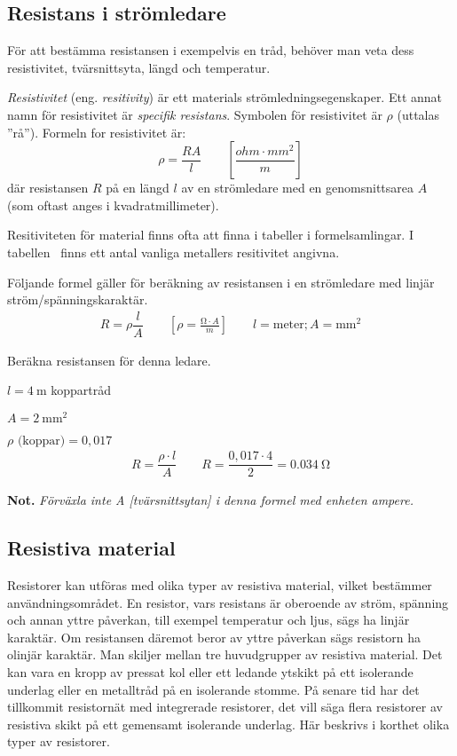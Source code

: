 \subsection{Resistans i strömledare}

För att bestämma resistansen i exempelvis en tråd, behöver man veta dess 
resistivitet, tvärsnittsyta, längd och temperatur.

\emph{Resistivitet} (eng. \emph{resitivity}) är ett materials
strömledningsegenskaper.
Ett annat namn för resistivitet är \emph{specifik resistans}.
Symbolen för resistivitet är \(\rho\) (uttalas ''rå'').
Formeln for resistivitet är:
\[\rho = \dfrac{R A}{l}\qquad \left[\dfrac{ohm \cdot mm^2}{m}\right]\]
där resistansen \(R\) på en längd \(l\) av en strömledare med en
genomsnittsarea \(A\) (som oftast anges i kvadratmillimeter).

Resitiviteten för material finns ofta att finna i tabeller i formelsamlingar.
I tabellen~ finns ett antal vanliga metallers resitivitet
angivna.

Följande formel gäller för beräkning av resistansen i en strömledare med linjär
ström/spänningskaraktär.
\[\begin{array}{c}
    R = \rho \dfrac{l}{A} \qquad \left[\rho = \frac{\unit{\ohm} \cdot A}{m} \right] \qquad l=\text{meter}; A=\unit{\milli\metre\squared}
\end{array}\]
\noindent
\begin{exempelbox}
Beräkna resistansen för denna ledare.

\(l = \qty{4}{\metre}\) koppartråd

\(A = \qty{2}{\milli\metre\squared}\)

\(\rho \text{ (koppar)} = 0,017\)
\tcblower
\[\begin{array}{c}
R = \dfrac{\rho \cdot l}{A} \qquad R = \dfrac{0,017 \cdot 4}{2} = \qty{0,034}{\ohm}
\end{array}\]

\noindent
\textbf{Not.} \emph{Förväxla inte A [tvärsnittsytan] i denna formel med enheten ampere.}
\end{exempelbox}

\subsection{Resistiva material}

Resistorer kan utföras med olika typer av resistiva material, vilket bestämmer
användningsområdet.
En resistor, vars resistans är oberoende av ström, spänning och annan yttre
påverkan, till exempel temperatur och ljus, sägs ha linjär karaktär.
Om resistansen däremot beror av yttre påverkan sägs resistorn ha olinjär
karaktär.
Man skiljer mellan tre huvudgrupper av resistiva material.
Det kan vara en kropp av pressat kol eller ett ledande ytskikt på ett isolerande
underlag eller en metalltråd på en isolerande stomme.
På senare tid har det tillkommit resistornät med integrerade resistorer, det
vill säga flera resistorer av resistiva skikt på ett gemensamt isolerande
underlag.
Här beskrivs i korthet olika typer av resistorer.


